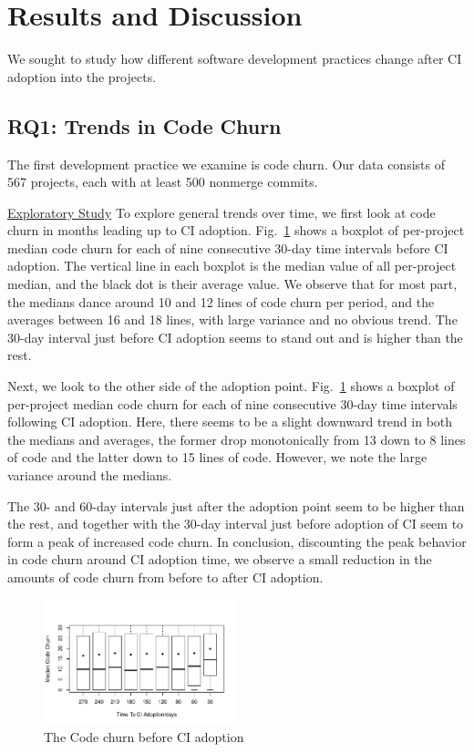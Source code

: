 
\section{Results and Discussion}

We sought to study how different software development practices change after CI adoption into the projects. 



\subsection{RQ1: Trends in Code Churn}

The first development practice we examine is code churn.
Our data consists of 567 projects, each with at least 500 nonmerge commits.

\noindent \underline{Exploratory Study} To explore general trends over time, we first look at code churn in months leading up to CI adoption.
Fig.~\ref{Fig:CodeChurnBefore} shows a boxplot of per-project median code churn for each of nine consecutive 30-day time intervals before CI adoption.
The vertical line in each boxplot is the median value of all per-project median, and the black dot is their average value.
We observe that for most part, the medians dance around 
10 and 12 lines of code churn per period, and the averages between 16 and 18 lines, with large variance and no obvious trend. The 30-day interval just before CI adoption seems to stand out and is higher than the rest.

Next, we look to the other side of the adoption point. Fig.~\ref{Fig:CodeChurnBefore} shows a boxplot of per-project median code churn for each of nine consecutive 30-day time intervals following CI adoption.
Here,  there seems to be a slight downward trend in both the medians and averages, the former drop monotonically from 13 down to 8 lines of code and the latter down to 15 lines of code.
However, we note the large variance around the medians.

The 30- and 60-day intervals just after the adoption point seem to be higher than the rest, and together with the 30-day interval just before adoption of CI seem to form a peak of increased code churn.
In conclusion, discounting the peak behavior in code churn around CI adoption time, we observe a small reduction in the amounts of code churn from before to after CI adoption.


\begin{figure}[!t]
\centering
\includegraphics[width=0.5\textwidth]{churn_before.pdf}
\caption{The Code churn before CI adoption}
\label{Fig:CodeChurnBefore}
\end{figure}


